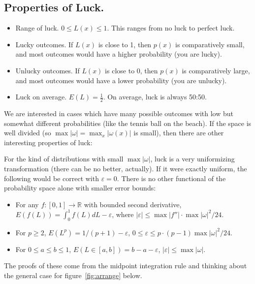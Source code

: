 \subsection{Properties of Luck.}
\begin{itemize}
\item Range of luck. $0 \leq L(x) \leq 1$.  This ranges from no luck to perfect luck.
\item Lucky outcomes. If $L(x)$ is close to 1, then $p(x)$ is comparatively small, and most outcomes would have a higher probability (you are lucky).  
\item Unlucky outcomes. If $L(x)$ is close to 0, then $p(x)$ is comparatively large, and most outcomes would have a lower probability (you are unlucky).
\item Luck on average. $E(L)=\frac{1}{2}$.  On average, luck is always 50:50.
\end{itemize}

We are interested in cases which have many possible outcomes with low but somewhat different probabilities (like the tennis ball on the beach).  If the space is well divided (so $\max |\omega|=\max_{x}|\omega(x)|$ is small), then there are other interesting properties of luck:

For the kind of distributions with small $\max |\omega|$, luck is a very uniformizing transformation (there can be no better, actually).  If it were exactly uniform, the following would be correct with $\varepsilon=0$.  There is no other functional of the probability space alone with smaller error bounds:
\begin{itemize}
\item For any $f: [0,1] \rightarrow \mathbb{R}$ with bounded second derivative, $E(f(L))=\int_0^1 f(L) dL-\varepsilon$, where $|\varepsilon| \leq \max|f''| \cdot \max |\omega|^2 / 24$.
\item For $p \geq 2$, $E(L^p)=1/(p+1)-\varepsilon$, $0 \leq \varepsilon \leq p \cdot (p-1) \max |\omega|^2/24$.
\item For $0 \leq a \leq b \leq 1$, $E(L \in [a,b])=b-a - \varepsilon$, $|\varepsilon| \leq \max |\omega|$.
\end{itemize}
The proofs of these come from the midpoint integration rule and thinking about the general case for figure~\ref{fig:arrange} below.

